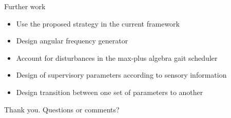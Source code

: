 \documentclass{beamer}
\begin{document}
\begin{frame}{Further work}
	\begin{itemize}\setlength\itemsep{0.5em}
		\item Use the proposed strategy in the current framework
		\item Design angular frequency generator
		\item Account for disturbances in the max-plus algebra gait scheduler
		\item Design of supervisory parameters according to sensory information
		\item Design transition between one set of parameters to another
	\end{itemize}
\end{frame}

\begin{frame}
 \hspace{2cm} Thank you. Questions or comments?
\end{frame}
\end{document}
